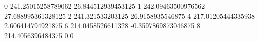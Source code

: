 0 241.25015258789062 26.844512939453125
1 242.09463500976562 27.688995361328125
2 241.321533203125 26.9158935546875
4 217.01205444335938 2.606414794921875
6 214.0458526611328 -0.3597869873046875
8 214.4056396484375 0.0
